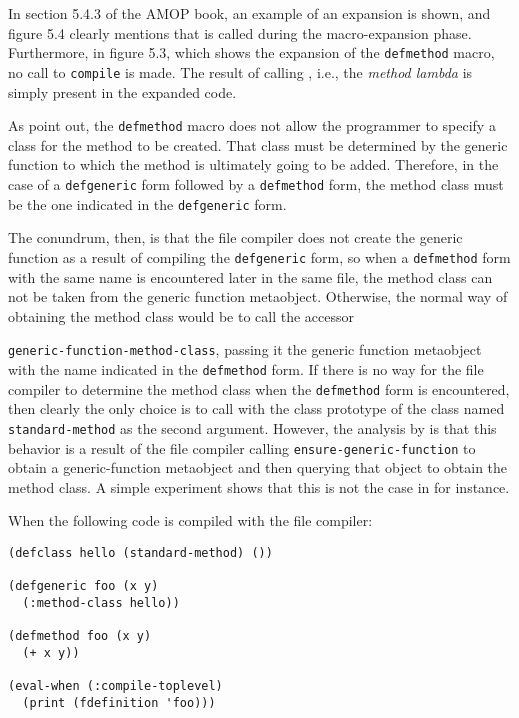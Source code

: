 In section 5.4.3 of the AMOP book, an example of an expansion is
shown, and figure 5.4 clearly mentions that \mml{} is called during
the macro-expansion phase.  Furthermore, in figure 5.3, which shows the
expansion of the \texttt{defmethod} macro, no call to \texttt{compile}
is made.  The result of calling \mml{}, i.e., the \emph{method lambda}
is simply present in the expanded code.

As \cnh{} point out, the \texttt{defmethod} macro does
not allow the programmer to specify a class for the method to be
created.  That class must be determined by the generic function to
which the method is ultimately going to be added.  Therefore, in the
case of a \texttt{defgeneric} form followed by a \texttt{defmethod}
form, the method class must be the one indicated in the
\texttt{defgeneric} form.

The conundrum, then, is that the file compiler does not create the
generic function as a result of compiling the \texttt{defgeneric}
form, so when a \texttt{defmethod} form with the same name is
encountered later in the same file, the method class can not be taken
from the generic function metaobject.  Otherwise, the normal way of
obtaining the method class would be to call the accessor

\texttt{generic-function-method-class}, passing it the generic
function metaobject with the name indicated in the \texttt{defmethod}
form.  If there is no way for the file compiler to determine the
method class when the \texttt{defmethod} form is encountered, then
clearly the only choice is to call \mml{} with the class prototype of
the class named \texttt{standard-method} as the second argument.
However, the analysis by \cnh{} is that this behavior is a result of
the file compiler calling \texttt{ensure-generic-function} to obtain a
generic-function metaobject and then querying that object to obtain
the method class.  A simple experiment shows that this is not the case
in \sbcl{} for instance.

When the following code is compiled with the \sbcl{} file compiler:

\begin{verbatim}
(defclass hello (standard-method) ())

(defgeneric foo (x y)
  (:method-class hello))

(defmethod foo (x y)
  (+ x y))

(eval-when (:compile-toplevel)
  (print (fdefinition 'foo)))
\end{verbatim}

